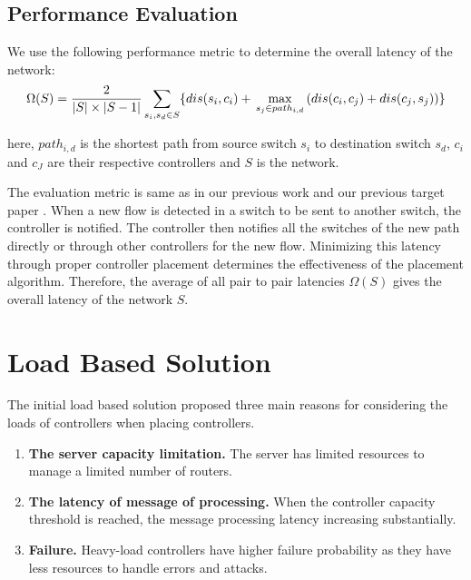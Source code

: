\documentclass{article}
\begin{document}
	\subsection{Performance Evaluation}
	We use the following performance metric to determine the overall latency of the network:
	\begin{equation} \label{eqn:setupLatency}
	\Omega(S) = \frac{2}{|S|\times |S-1|}\sum_{s_i,s_d\in S} \{dis(s_i,c_i)+\\ \max_{s_j\in path_{i,d}}\left(dis(c_i,c_j)+dis(c_j,s_j) \right) \}
	\end{equation}
	
	here, $path_{i,d}$ is the shortest path from source switch $s_i$ to destination switch $s_d$, $c_i$ and $c_J$ are their respective controllers and $S$ is the network.
	
	The evaluation metric is same as in our previous work \cite{aziz2019degree} and our previous target paper \cite{dbcp2017}. When a new flow is detected in a switch to be sent to another switch, the controller is notified. The controller then notifies all the switches of the new path directly or through other controllers for the new flow. Minimizing this latency through proper controller placement determines the effectiveness of the placement algorithm. Therefore, the average of all pair to pair latencies $\Omega(S)$ gives the overall latency of the network $S$.
	
	\section{Load Based Solution} \label{loadBased}
	The initial load based solution \cite{yao2014capacitated} proposed three main reasons for considering the loads of controllers when placing controllers.
	\begin{enumerate}
		\item \textbf{The server capacity limitation.} The server has limited resources to manage a limited number of routers.
		\item \textbf{The latency of message of processing.} When the controller capacity threshold is reached, the message processing latency increasing substantially.
		\item \textbf{Failure.} Heavy-load controllers have higher failure probability as they have less resources to handle errors and attacks.
	\end{enumerate}
\end{document}

